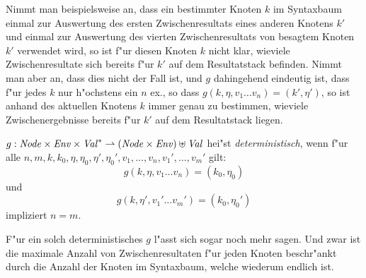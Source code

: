 \documentclass[12pt,a4paper]{article}
\begin{document}
Nimmt man beispielsweise an, dass ein bestimmter Knoten $k$ im Syntaxbaum einmal zur Auswertung des ersten
Zwischenresultats eines anderen Knotens $k'$ und einmal zur Auswertung des vierten Zwischenresultats von
besagtem Knoten $k'$ verwendet wird, so ist f"ur diesen Knoten $k$ nicht klar, wieviele Zwischenresultate
sich bereits f"ur $k'$ auf dem Resultatstack befinden. Nimmt man aber an, dass dies nicht der Fall ist, und
$g$ dahingehend eindeutig ist, dass f"ur jedes $k$ nur h"ochstens ein $n$ ex., so dass
$g(k,\eta,v_1 \ldots v_n) = (k',\eta')$, so ist anhand des aktuellen Knotens $k$ immer genau zu bestimmen,
wieviele Zwischenergebnisse bereits f"ur $k'$ auf dem Resultatstack liegen.

\begin{definition}
  $g: \mathit{Node} \times \mathit{Env} \times \mathit{Val}^* \rightharpoonup (\mathit{Node} \times \mathit{Env}) \uplus \mathit{Val}$ hei"st
  \emph{deterministisch}, wenn f"ur alle $n,m,k,k_0,\eta,\eta_0,\eta',\eta_0',v_1,\ldots,v_n,v_1',\ldots,v_m'$
  gilt: \\
  \[g(k,\eta,v_1 \ldots v_n) = (k_0,\eta_0)\]
  und
  \[g(k,\eta',v_1' \ldots v_m') = (k_0,\eta_0')\]
  impliziert $n = m$.
\end{definition}

F"ur ein solch deterministisches $g$ l"asst sich sogar noch mehr sagen. Und zwar ist die maximale Anzahl
von Zwischenresultaten f"ur jeden Knoten beschr"ankt durch die Anzahl der Knoten im Syntaxbaum, welche
wiederum endlich ist.
\end{document}

